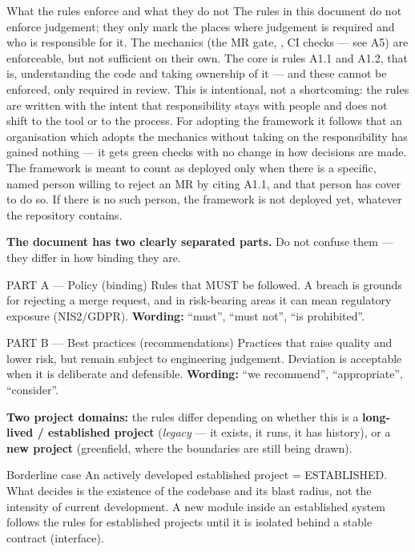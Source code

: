 \begin{callout}[amber]{What the rules enforce and what they do not}
The rules in this document do not enforce judgement; they only mark the places where judgement is required and who is responsible for it.
The mechanics (the MR gate, , CI checks --- see A5) are enforceable, but not sufficient on their own.
The core is rules A1.1 and A1.2, that is, understanding the code and taking ownership of it --- and these cannot be enforced, only required in review.
This is intentional, not a shortcoming: the rules are written with the intent that responsibility stays with people and does not shift to the tool or to the process.
For adopting the framework it follows that an organisation which adopts the mechanics without taking on the responsibility has gained nothing --- it gets green checks with no change in how decisions are made.
The framework is meant to count as deployed only when there is a specific, named person willing to reject an MR by citing A1.1, and that person has cover to do so.
If there is no such person, the framework is not deployed yet, whatever the repository contains.
\end{callout}

\medskip
\textbf{The document has two clearly separated parts.}
Do not confuse them --- they differ in how binding they are.

\begin{callout}[light]{PART A --- Policy (binding)}
Rules that MUST be followed.
A breach is grounds for rejecting a merge request, and in risk-bearing areas it can mean regulatory exposure (NIS2/GDPR).
\textbf{Wording:} \enquote{must}, \enquote{must not}, \enquote{is prohibited}.
\end{callout}

\begin{callout}[green]{PART B --- Best practices (recommendations)}
Practices that raise quality and lower risk, but remain subject to engineering judgement.
Deviation is acceptable when it is deliberate and defensible.
\textbf{Wording:} \enquote{we recommend}, \enquote{appropriate}, \enquote{consider}.
\end{callout}

\medskip
\textbf{Two project domains:} the rules differ depending on whether this is a \textbf{long-lived / established project} (\emph{legacy} --- it exists, it runs, it has history), or a \textbf{new project} (greenfield, where the boundaries are still being drawn).

\begin{callout}[amber]{Borderline case}
An actively developed established project = ESTABLISHED.
What decides is the existence of the codebase and its blast radius, not the intensity of current development.
A new module inside an established system follows the rules for established projects until it is isolated behind a stable contract (interface).
\end{callout}

